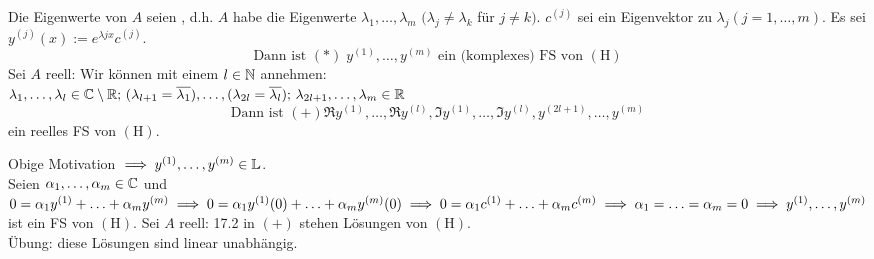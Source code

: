 \documentclass[a4paper,twoside,DIV15,BCOR12mm]{scrbook}
\begin{document}
\begin{satz} %
Die Eigenwerte von $A$ seien , d.h. $A$ habe die Eigenwerte $\lambda_1, \ldots, \lambda_m$
$(\lambda_j \neq \lambda_k$ für $j \neq k)$. $c^{(j)}$ sei ein Eigenvektor zu $\lambda_j (j=1,\ldots,m)$. Es sei $y^{(j)}(x):=e^{\lambda jx}c^{(j)}.$ 
$$\text{Dann ist } (*) \; y^{(1)}, \ldots, y^{(m)} \text{ ein (komplexes) FS von } (\text{H}) $$
Sei $A$ reell: Wir können mit einem $l \in \mathbb{N}$ annehmen: \\
$\lambda_1, \ldots, \lambda_l \in \mathbb{C} \setminus \mathbb{R}; \, (\lambda_{l+1} = \overline{\lambda_1}), \ldots, (\lambda_{2l} = \overline{\lambda_l}); \, \lambda_{2l+1}, \ldots, \lambda_m \in \mathbb{R}$ \\
$$\text{Dann ist } (+) \Re y^{(1)}, \ldots, \Re y^{(l)}, \Im y^{(1)}, \ldots, \Im y^{(l)}, y^{(2l+1)}, \ldots, y^{(m)}$$ ein reelles FS von $(\text{H})$.
\end{satz}


\begin{beweis}
Obige Motivation $\implies y^{(1)}, \ldots, y^{(m)} \in \mathbb{L}$. \\
Seien $\alpha_1, \ldots, \alpha_m \in \mathbb{C}$ und $0 = \alpha_1 y^{(1)} + \ldots + \alpha_m y^{(m)} \\
\implies 0 = \alpha_1 y^{(1)}(0) + \ldots + \alpha_m y^{(m)}(0) \implies 0 = \alpha_1 c^{(1)} + \ldots + \alpha_m c^{(m)} \\
\implies \alpha_1 = \ldots = \alpha_m = 0 \implies y^{(1)}, \ldots, y^{(m)}$ ist ein FS von $(\text{H})$. Sei $A$ reell: 17.2 \folgt in $(+)$ stehen Lösungen von $(\text{H})$.\\
Übung: diese Lösungen sind linear unabhängig.
\end{beweis}
\end{document}
